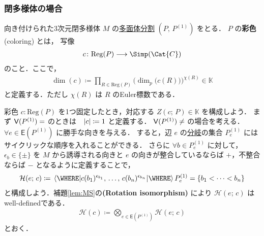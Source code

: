 \documentclass[TQFT_main]{subfiles}
\begin{document}
\subsubsection{閉多様体の場合}

向き付けられた3次元閉多様体 $M$ の\hyperref[def:polytope-decomp]{多面体分割} $(P,\, P^{(1)})$ をとる．
$P$ の\textbf{彩色} (coloring) とは，
写像
\begin{align}
    c \colon \mathrm{Reg}(P) \lto \Simp(\Cat{C})
\end{align}
のこと．ここで，
\begin{align}
    \dim (c) \coloneqq \prod_{R \in \mathrm{Reg}(P)} \bigl( \dim_p \bigl( c(R) \bigr)  \bigr)^{\chi(R)} \in \mathbb{K}
\end{align}
と定義する．ただし $\chi(R)$ は $R$ のEuler標数である．

彩色 $c \colon \mathrm{Reg}(P)$ を1つ固定したとき，対応する $Z(c;\, P) \in \mathbb{K}$ を構成しよう．
まず $\mathsf{V}(P^{(1)}) = \empty$ のときは　$\abs{c} \coloneqq 1$ と定義する．
$\mathsf{V}(P^{(1)}) \neq \empty$ の場合を考える．
$\forall e \in \mathsf{E}(P^{(1)})$ に勝手な向きを与える．
すると，辺 $e$ の\hyperref[def:polyhedron]{分岐}の集合 $P^{(1)}_e$ にはサイクリックな順序を入れることができる．
さらに $\forall b \in P_e^{(1)}$ に対して，$\epsilon_b \in \{\pm\}$ を $M$ から誘導される向きと $e$ の向きが整合しているならば $+$，不整合ならば $-$ となるように定義することで，
\begin{align}
    \mathcal{H}(e;\, c) \coloneqq \expval{c(b_1)^{\epsilon_{b_1}},\, \dots,\, c(b_n)^{\epsilon_{b_n}}} \WHERE P_e^{(1)} = \{b_1 < \cdots < b_n\}
\end{align}
と構成しよう．補題\ref{lem:MS}の\textsf{\textbf{(Rotation isomorphism)}} により $\mathcal{H}(e;\, c)$ はwell-definedである．
\begin{align}
    \mathcal{H}(c) \coloneqq \bigotimes_{e \in \mathsf{E}(P^{(1)})} \mathcal{H}(e;\, c)
\end{align}
とおく．
\end{document}
